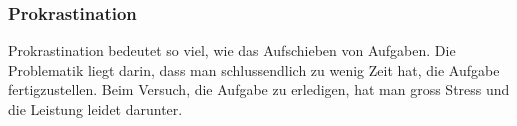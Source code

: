 \subsubsection{Prokrastination}
Prokrastination bedeutet so viel, wie das Aufschieben von Aufgaben. Die Problematik liegt darin, dass man schlussendlich zu wenig Zeit hat, die Aufgabe fertigzustellen. Beim Versuch, die Aufgabe zu erledigen, hat man gross Stress und die Leistung leidet darunter.
